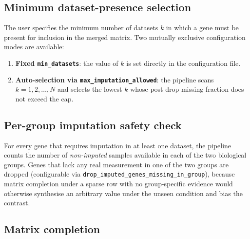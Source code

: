 \documentclass[11pt,a4paper]{article}
\begin{document}
\subsection{Minimum dataset-presence selection}

The user specifies the minimum number of datasets $k$ in which
a gene must be present for inclusion in the merged matrix. Two
mutually exclusive configuration modes are available:

\begin{enumerate}
  \item \textbf{Fixed \texttt{min\_datasets}}: the value of $k$
    is set directly in the configuration file.
  \item \textbf{Auto-selection via
    \texttt{max\_imputation\_allowed}}: the pipeline scans
    $k = 1, 2, \ldots, N$ and selects the lowest $k$ whose
    post-drop missing fraction does not exceed the cap.
\end{enumerate}

\subsection{Per-group imputation safety check}
\label{sec:coverage}

For every gene that requires imputation in at least one dataset,
the pipeline counts the number of \emph{non-imputed} samples
available in each of the two biological groups. Genes that lack
any real measurement in one of the two groups are dropped
(configurable via
\texttt{drop\_imputed\_genes\_\allowbreak missing\_in\_group}), because
matrix completion under a sparse row with no group-specific
evidence would otherwise synthesise an arbitrary value under the
unseen condition and bias the contrast.

\subsection{Matrix completion}
\end{document}
